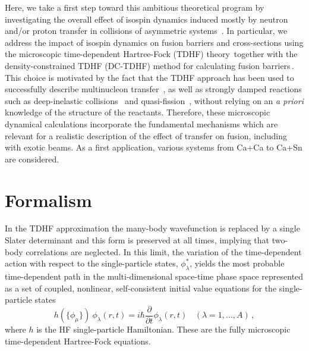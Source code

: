 Here, we take a first step toward this ambitious theoretical program by investigating the overall effect of isospin dynamics induced mostly by neutron and/or proton transfer in collisions of asymmetric systems~\citep{dasso1985,chomaz1993,baran1996,baran2001,simenel2001,baran2005,simenel2007,baran2009,oberacker2012,umar2008a}.
In particular, we address the impact of isospin dynamics on fusion barriers and cross-sections using
the microscopic
time-dependent Hartree-Fock (TDHF) theory\,\citep{negele1982,simenel2012}
together with the density-constrained TDHF (DC-TDHF) method for calculating fusion barriers\,\citep{umar2006b}.
This choice is motivated by the fact that the TDHF approach has been used to successfully describe multinucleon transfer~\citep{simenel2010,simenel2012b,sekizawa2013,scamps2013a,bourgin2016}, as well as strongly damped reactions such as deep-inelastic collisions~\citep{koonin1977,simenel2011} and quasi-fission~\citep{wakhle2014,umar2015a,umar2016}, without relying on an {\it a priori} knowledge of the structure of the reactants.
Therefore, these microscopic dynamical calculations incorporate the fundamental mechanisms which are relevant for a realistic description of the effect of transfer on fusion, including with exotic beams.
As a first application, various systems from Ca+Ca to Ca+Sn are considered.

\section{Formalism}

In the TDHF approximation the many-body wavefunction is replaced by a single
Slater determinant and this form is preserved at all times, implying that two-body correlations
are neglected.
In this limit, the
variation of the time-dependent action with respect to the single-particle states, $\phi^{*}_{\lambda}$, yields the most probable time-dependent path
in the multi-dimensional space-time phase space
represented as a
set of coupled, nonlinear, self-consistent initial value equations
for the single-particle states
\begin{equation}
h(\{\phi_{\mu}\}) \ \phi_{\lambda} (r,t) = i \hbar \frac{\partial}{\partial t} \phi_{\lambda} (r,t)
\ \ \ \ (\lambda = 1,...,A)\,,
\label{eq:TDHF}
\end{equation}
where $h$ is the HF single-particle Hamiltonian.
These are the fully microscopic time-dependent Hartree-Fock equations.


